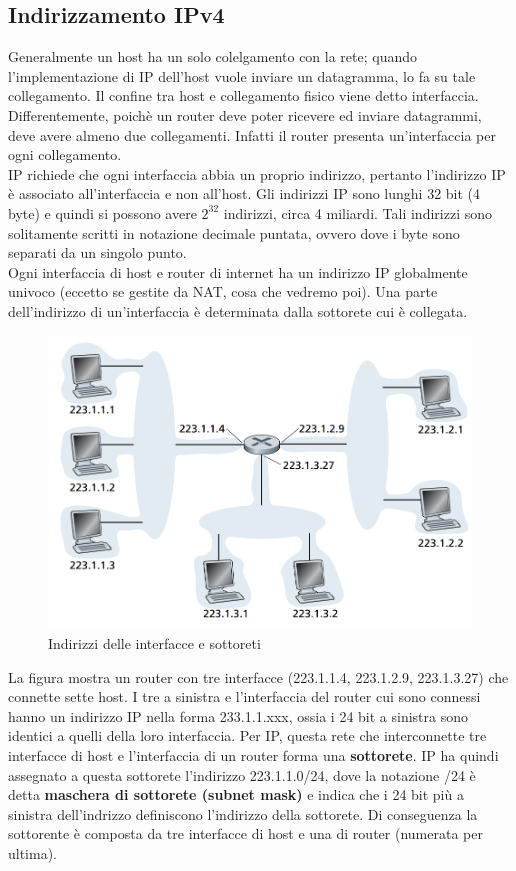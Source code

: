 \documentclass[11pt,a4paper]{book}
\begin{document}
\subsection{Indirizzamento IPv4}
Generalmente un host ha un solo colelgamento con la rete; quando l'implementazione di IP dell'host vuole inviare un datagramma, lo fa su tale collegamento. Il confine tra host e collegamento fisico viene detto interfaccia. \\
Differentemente, poichè un router deve poter ricevere ed inviare datagrammi, deve avere almeno due collegamenti. Infatti il router presenta un'interfaccia per ogni collegamento. \\
IP richiede che ogni interfaccia abbia un proprio indirizzo, pertanto l'indirizzo IP è associato all'interfaccia e non all'host. Gli indirizzi IP sono lunghi 32 bit (4 byte) e quindi si possono avere $2^{32}$ indirizzi, circa 4 miliardi. Tali indirizzi sono solitamente scritti in notazione decimale puntata, ovvero dove i byte sono separati da un singolo punto. \\
Ogni interfaccia di host e router di internet ha un indirizzo IP globalmente univoco (eccetto se gestite da NAT, cosa che vedremo poi). Una parte dell'indirizzo di un'interfaccia è determinata dalla sottorete cui è collegata.
\begin{figure}
	\includegraphics[scale=0.5]{img/054.png}
	\caption{Indirizzi delle interfacce e sottoreti}
\end{figure}
La figura mostra un router con tre interfacce (223.1.1.4, 223.1.2.9, 223.1.3.27) che connette sette host. I tre a sinistra e l'interfaccia del router cui sono connessi hanno un indirizzo IP nella forma 233.1.1.xxx, ossia i 24 bit a sinistra sono identici a quelli della loro interfaccia. Per IP, questa rete che interconnette tre interfacce di host e l'interfaccia di un router forma una \textbf{sottorete}. IP ha quindi assegnato a questa sottorete l'indirizzo 223.1.1.0/24, dove la notazione /24 è detta \textbf{maschera di sottorete (subnet mask)} e indica che i 24 bit più a sinistra dell'indrizzo definiscono l'indirizzo della sottorete. Di conseguenza la sottorente è composta da tre interfacce di host e una di router (numerata per ultima). \\
\end{document}
